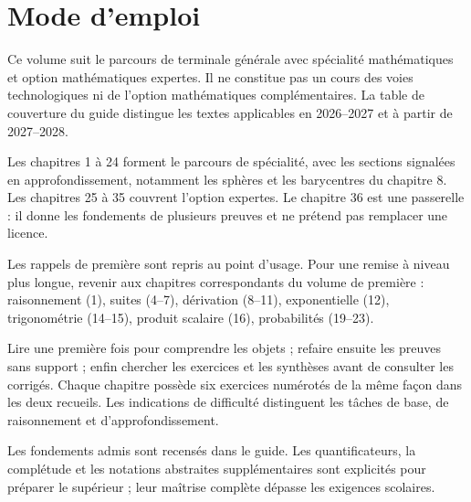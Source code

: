 \documentclass[11pt,a4paper,oneside]{book}
\begin{document}
\frontmatter
\chapter*{Mode d'emploi}
Ce volume suit le parcours de terminale générale avec spécialité mathématiques et option mathématiques expertes. Il ne constitue pas un cours des voies technologiques ni de l'option mathématiques complémentaires. La table de couverture du guide distingue les textes applicables en 2026--2027 et à partir de 2027--2028.

Les chapitres 1 à 24 forment le parcours de spécialité, avec les sections signalées en approfondissement, notamment les sphères et les barycentres du chapitre 8. Les chapitres 25 à 35 couvrent l'option expertes. Le chapitre 36 est une passerelle : il donne les fondements de plusieurs preuves et ne prétend pas remplacer une licence.

Les rappels de première sont repris au point d'usage. Pour une remise à niveau plus longue, revenir aux chapitres correspondants du volume de première : raisonnement (1), suites (4--7), dérivation (8--11), exponentielle (12), trigonométrie (14--15), produit scalaire (16), probabilités (19--23).

Lire une première fois pour comprendre les objets ; refaire ensuite les preuves sans support ; enfin chercher les exercices et les synthèses avant de consulter les corrigés. Chaque chapitre possède six exercices numérotés de la même façon dans les deux recueils. Les indications de difficulté distinguent les tâches de base, de raisonnement et d'approfondissement.

Les fondements admis sont recensés dans le guide. Les quantificateurs, la complétude et les notations abstraites supplémentaires sont explicités pour préparer le supérieur ; leur maîtrise complète dépasse les exigences scolaires.
\tableofcontents
\mainmatter





































\end{document}
